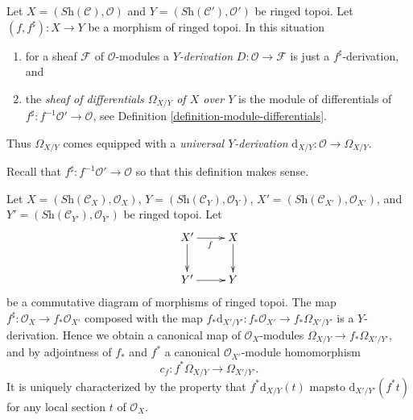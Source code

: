 \begin{definition}
\label{definition-sheaf-differentials}
Let $X = (\textit{Sh}(\mathcal{C}), \mathcal{O})$ and
$Y = (\textit{Sh}(\mathcal{C}'), \mathcal{O}')$ be ringed topoi.
Let $(f, f^\sharp) : X \to Y$ be a morphism of ringed topoi.
In this situation
\begin{enumerate}
\item for a sheaf $\mathcal{F}$ of $\mathcal{O}$-modules a
{\it $Y$-derivation} $D : \mathcal{O} \to \mathcal{F}$ is just a
$f^\sharp$-derivation, and
\item the {\it sheaf of differentials $\Omega_{X/Y}$ of $X$ over $Y$}
is the module of differentials of
$f^\sharp : f^{-1}\mathcal{O}' \to \mathcal{O}$,
see Definition \ref{definition-module-differentials}.
\end{enumerate}
Thus $\Omega_{X/Y}$ comes equipped with a {\it universal $Y$-derivation}
$\text{d}_{X/Y} : \mathcal{O} \longrightarrow \Omega_{X/Y}$.
\end{definition}

\noindent
Recall that $f^\sharp : f^{-1}\mathcal{O}' \to \mathcal{O}$ so that
this definition makes sense.

\begin{lemma}
\label{lemma-functoriality-differentials}
Let
$X = (\textit{Sh}(\mathcal{C}_X), \mathcal{O}_X)$,
$Y = (\textit{Sh}(\mathcal{C}_Y), \mathcal{O}_Y)$,
$X' = (\textit{Sh}(\mathcal{C}_{X'}), \mathcal{O}_{X'})$, and
$Y' = (\textit{Sh}(\mathcal{C}_{Y'}), \mathcal{O}_{Y'})$ be ringed topoi.
Let
$$
\xymatrix{
X' \ar[d] \ar[r]_f & X \ar[d] \\
Y' \ar[r] & Y
}
$$
be a commutative diagram of morphisms of ringed topoi. The map
$f^\sharp : \mathcal{O}_X \to f_*\mathcal{O}_{X'}$ composed with the map
$f_*\text{d}_{X'/Y'} : f_*\mathcal{O}_{X'} \to f_*\Omega_{X'/Y'}$ is a
$Y$-derivation. Hence we obtain a canonical map of $\mathcal{O}_X$-modules
$\Omega_{X/Y} \to f_*\Omega_{X'/Y'}$, and by
adjointness of $f_*$ and $f^*$ a
canonical $\mathcal{O}_{X'}$-module homomorphism
$$
c_f : f^*\Omega_{X/Y} \longrightarrow \Omega_{X'/Y'}.
$$
It is uniquely characterized by the property that
$f^*\text{d}_{X/Y}(t)$ mapsto $\text{d}_{X'/Y'}(f^* t)$
for any local section $t$ of $\mathcal{O}_X$.
\end{lemma}

